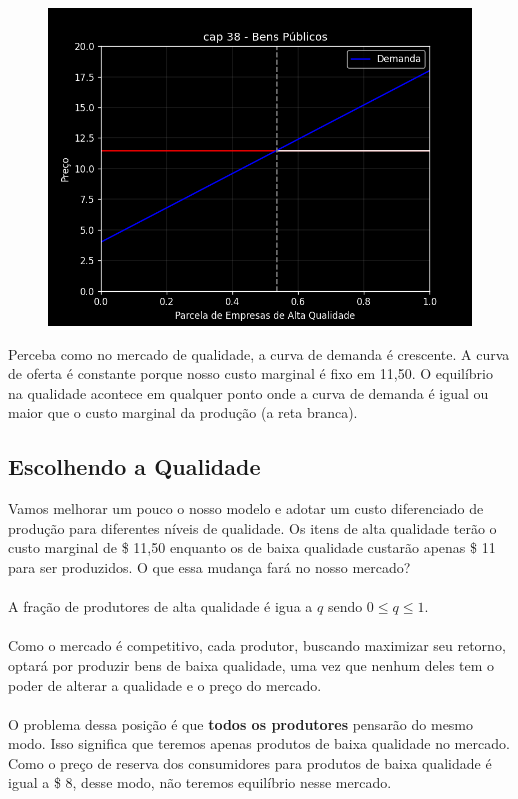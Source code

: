\documentclass[a4paper,11pt,oneside]{book}
\theoremstyle{definition}
\theoremstyle{break}
\begin{document}
\begin{figure}[H]
	\centering
	\includegraphics[scale=0.56]{cap38_2-qualidade_equilibrio.png}
\end{figure}

Perceba como no mercado de qualidade, a curva de demanda é crescente. A curva de oferta é constante porque nosso custo marginal é fixo em 11,50. O equilíbrio na qualidade acontece em qualquer ponto onde a curva de demanda é igual ou maior que o custo marginal da produção (a reta branca).

\subsection{Escolhendo a Qualidade}

Vamos melhorar um pouco o nosso modelo e adotar um custo diferenciado de produção para diferentes níveis de qualidade. Os itens de alta qualidade terão o custo marginal de \$ 11,50 enquanto os de baixa qualidade custarão apenas \$ 11 para ser produzidos. O que essa mudança fará no nosso mercado?
\\~\\
A fração de produtores de alta qualidade é igua a $q$ sendo $ 0 \leq q \leq 1$. 
\\~\\
Como o mercado é competitivo, cada produtor, buscando maximizar seu retorno, optará por produzir bens de baixa qualidade, uma vez que nenhum deles tem o poder de alterar a qualidade e o preço do mercado.
\\~\\
O problema dessa posição é que \textbf{todos os produtores} pensarão do mesmo modo. Isso significa que teremos apenas produtos de baixa qualidade no mercado. Como o preço de reserva dos consumidores para produtos de baixa qualidade é igual a \$ 8, desse modo, não teremos equilíbrio nesse mercado.
\end{document}
